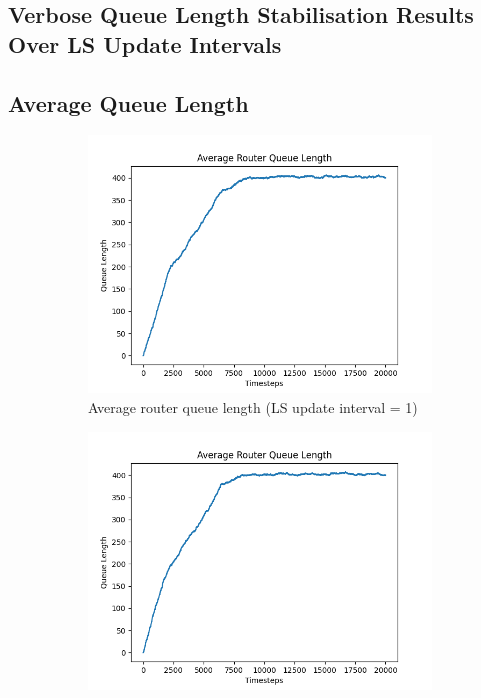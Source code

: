 \begin{appendices}
\chapter{Verbose Queue Length Stabilisation Results Over LS Update Intervals}
\section{Average Queue Length}
    \begin{figure}[h]
        \centering
        \begin{subfigure}[b]{0.475\textwidth}
            \centering
            \includegraphics[width=\textwidth]{figs/appendix/average_ls=1.png}
            \caption[]{Average router queue length (LS update interval = 1)}
        \end{subfigure}
        \hfill
        \begin{subfigure}[b]{0.475\textwidth}
            \centering
            \includegraphics[width=\textwidth]{figs/appendix/average_ls=10.png}

\end{subfigure}
\end{figure}
\end{appendices}
